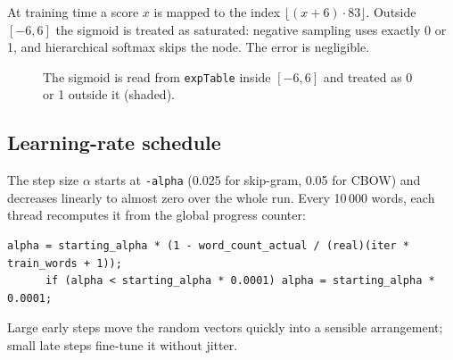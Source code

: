 \documentclass[11pt,a4paper]{article}
\newcommand{\code}[1]{\texttt{#1}}
\newcommand{\vout}{\mathbf{u}}
\begin{document}
At training time a score $x$ is mapped to the index $\lfloor (x+6)\cdot 83\rfloor$.
Outside $[-6,6]$ the sigmoid is treated as saturated: negative sampling uses
exactly 0 or 1, and hierarchical softmax skips the node. The error is negligible.

\begin{figure}[ht]
\centering
{}
\caption{The sigmoid is read from \code{expTable} inside $[-6,6]$ and treated as 0 or 1
outside it (shaded).}
\end{figure}

\subsection{Learning-rate schedule}

The step size $\alpha$ starts at \code{-alpha} (0.025 for skip-gram, 0.05 for CBOW)
and decreases linearly to almost zero over the whole run. Every 10\,000 words, each
thread recomputes it from the global progress counter:

\begin{lstlisting}[firstnumber=412]
      alpha = starting_alpha * (1 - word_count_actual / (real)(iter * train_words + 1));
      if (alpha < starting_alpha * 0.0001) alpha = starting_alpha * 0.0001;
\end{lstlisting}

Large early steps move the random vectors quickly into a sensible arrangement; small
late steps fine-tune it without jitter.
\end{document}
